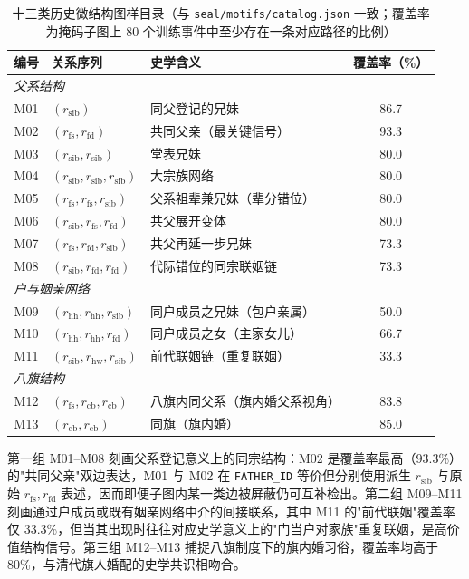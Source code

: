 \begin{table}[ht]
  \centering
  \caption{十三类历史微结构图样目录（与 \texttt{seal/motifs/catalog.json} 一致；覆盖率为掩码子图上 80 个训练事件中至少存在一条对应路径的比例）}\label{tab:motif-catalog}
  \begin{tabular}{c l l c}
    \toprule
    编号 & 关系序列 & 史学含义 & 覆盖率（\%）\\
    \midrule
    \multicolumn{4}{l}{\emph{父系结构}}\\
    M01 & $(r_\mathrm{sib})$ & 同父登记的兄妹 & 86.7 \\
    M02 & $(r_\mathrm{fs},r_\mathrm{fd})$ & 共同父亲（最关键信号） & 93.3 \\
    M03 & $(r_\mathrm{sib},r_\mathrm{sib})$ & 堂表兄妹 & 80.0 \\
    M04 & $(r_\mathrm{sib},r_\mathrm{sib},r_\mathrm{sib})$ & 大宗族网络 & 80.0 \\
    M05 & $(r_\mathrm{fs},r_\mathrm{fs},r_\mathrm{sib})$ & 父系祖辈兼兄妹（辈分错位） & 80.0 \\
    M06 & $(r_\mathrm{sib},r_\mathrm{fs},r_\mathrm{fd})$ & 共父展开变体 & 80.0 \\
    M07 & $(r_\mathrm{fs},r_\mathrm{fd},r_\mathrm{sib})$ & 共父再延一步兄妹 & 73.3 \\
    M08 & $(r_\mathrm{sib},r_\mathrm{fd},r_\mathrm{fd})$ & 代际错位的同宗联姻链 & 73.3 \\
    \multicolumn{4}{l}{\emph{户与姻亲网络}}\\
    M09 & $(r_\mathrm{hh},r_\mathrm{hh},r_\mathrm{sib})$ & 同户成员之兄妹（包户亲属） & 50.0 \\
    M10 & $(r_\mathrm{hh},r_\mathrm{hh},r_\mathrm{fd})$ & 同户成员之女（主家女儿） & 66.7 \\
    M11 & $(r_\mathrm{sib},r_\mathrm{hw},r_\mathrm{sib})$ & 前代联姻链（重复联姻） & 33.3 \\
    \multicolumn{4}{l}{\emph{八旗结构}}\\
    M12 & $(r_\mathrm{fs},r_\mathrm{cb},r_\mathrm{cb})$ & 八旗内同父系（旗内婚父系视角） & 83.8 \\
    M13 & $(r_\mathrm{cb},r_\mathrm{cb})$ & 同旗（旗内婚） & 85.0 \\
    \bottomrule
  \end{tabular}
\end{table}

第一组 M01--M08 刻画父系登记意义上的同宗结构：M02 是覆盖率最高（93.3\%）的"共同父亲"双边表达，M01 与 M02 在 \texttt{FATHER\_ID} 等价但分别使用派生 $r_\mathrm{sib}$ 与原始 $r_\mathrm{fs},r_\mathrm{fd}$ 表述，因而即便子图内某一类边被屏蔽仍可互补检出。第二组 M09--M11 刻画通过户成员或既有姻亲网络中介的间接联系，其中 M11 的"前代联姻"覆盖率仅 33.3\%，但当其出现时往往对应史学意义上的"门当户对家族"重复联姻，是高价值结构信号。第三组 M12--M13 捕捉八旗制度下的旗内婚习俗，覆盖率均高于 80\%，与清代旗人婚配的史学共识相吻合。


